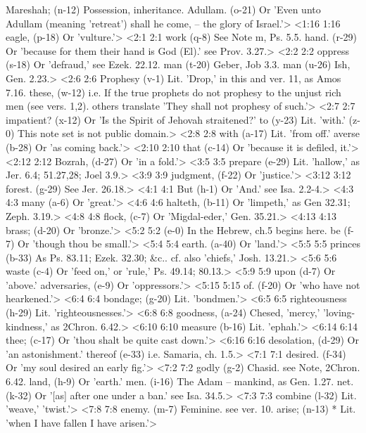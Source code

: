   Mareshah; (n-12)  Possession, inheritance.
  Adullam. (o-21)  Or 'Even unto Adullam (meaning 'retreat') shall he come, --  the glory of Israel.'>
<1:16 1:16  eagle, (p-18)  Or 'vulture.'>
<2:1 2:1  work (q-8)  See Note m, Ps. 5.5.
  hand. (r-29)  Or 'because for them their hand is God (El).' see Prov. 3.27.>
<2:2 2:2  oppress (s-18)  Or 'defraud,' see Ezek. 22.12.
  man (t-20)  Geber, Job 3.3.
  man (u-26)  Ish, Gen. 2.23.>
<2:6 2:6  Prophesy (v-1)  Lit. 'Drop,' in this and ver. 11, as Amos 7.16.
  these, (w-12)  i.e. If the true prophets do not prophesy to the unjust rich  men (see vers. 1,2). others translate 'They shall not prophesy  of such.'>
<2:7 2:7  impatient? (x-12)  Or 'Is the Spirit of Jehovah straitened?'
  to (y-23)  Lit. 'with.'
  (z-0) This note set is not public domain.>
<2:8 2:8  with (a-17)  Lit. 'from off.'
  averse (b-28)  Or 'as coming back.'>
<2:10 2:10  that (c-14)  Or 'because it is defiled, it.'>
<2:12 2:12  Bozrah, (d-27)  Or 'in a fold.'>
<3:5 3:5  prepare (e-29)  Lit. 'hallow,' as Jer. 6.4; 51.27,28; Joel 3.9.>
<3:9 3:9  judgment, (f-22)  Or 'justice.'>
<3:12 3:12  forest. (g-29)  See Jer. 26.18.>
<4:1 4:1  But (h-1)  Or 'And.' see Isa. 2.2-4.>
<4:3 4:3  many (a-6)  Or 'great.'>
<4:6 4:6  halteth, (b-11)  Or 'limpeth,' as Gen 32.31; Zeph. 3.19.>
<4:8 4:8  flock, (c-7)  Or 'Migdal-eder,' Gen. 35.21.>
<4:13 4:13  brass; (d-20)  Or 'bronze.'>
<5:2 5:2   (e-0)  In the Hebrew, ch.5 begins here.
  be (f-7)  Or 'though thou be small.'>
<5:4 5:4  earth. (a-40)  Or 'land.'>
<5:5 5:5  princes (b-33)  As Ps. 83.11; Ezek. 32.30; &c.. cf. also 'chiefs,' Josh. 13.21.>
<5:6 5:6  waste (c-4)  Or 'feed on,' or 'rule,' Ps. 49.14; 80.13.>
<5:9 5:9  upon (d-7)  Or 'above.'
  adversaries, (e-9)  Or 'oppressors.'>
<5:15 5:15  of. (f-20)  Or 'who have not hearkened.'>
<6:4 6:4  bondage; (g-20)  Lit. 'bondmen.'>
<6:5 6:5  righteousness (h-29)  Lit. 'righteousnesses.'>
<6:8 6:8  goodness, (a-24)  Chesed, 'mercy,' 'loving-kindness,' as 2Chron. 6.42.>
<6:10 6:10  measure (b-16)  Lit. 'ephah.'>
<6:14 6:14  thee; (c-17)  Or 'thou shalt be quite cast down.'>
<6:16 6:16  desolation, (d-29)  Or 'an astonishment.'
  thereof (e-33)  i.e. Samaria, ch. 1.5.>
<7:1 7:1  desired. (f-34)  Or 'my soul desired an early fig.'>
<7:2 7:2  godly (g-2)  Chasid. see Note, 2Chron. 6.42.
  land, (h-9)  Or 'earth.'
  men. (i-16)  The Adam -- mankind, as Gen. 1.27.
  net. (k-32)  Or '[as] after one under a ban.' see Isa. 34.5.>
<7:3 7:3  combine (l-32)  Lit. 'weave,' 'twist.'>
<7:8 7:8  enemy. (m-7)  Feminine. see ver. 10.
  arise; (n-13)  * Lit. 'when I have fallen I have arisen.'>

